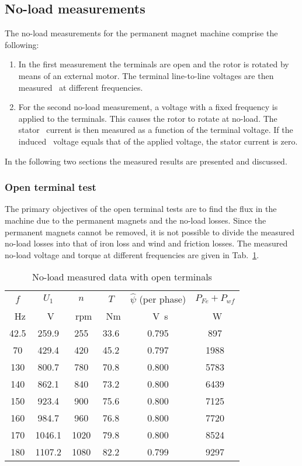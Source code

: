\subsection{No-load measurements}
The no-load measurements for the permanent magnet machine comprise the following:
\begin{enumerate}
  \item In the first measurement the terminals are open and the rotor is rotated by~%
  means of an external motor. The terminal line-to-line voltages are then measured~%
  at different frequencies.  
  \item For the second no-load measurement, a voltage with a fixed frequency is~%
  applied to the terminals. This causes the rotor to rotate at no-load. The stator~%
  current is then measured as a function of the terminal voltage. If the induced~%
  voltage equals that of the applied voltage, the stator current is zero. 
\end{enumerate}
In the following two sections the measured results are presented and discussed.
 
\subsubsection{Open terminal test}
The primary objectives of the open terminal tests are to find the flux in the machine due to the permanent magnets and the no-load losses. Since the permanent magnets cannot be removed, it is not possible to divide the measured no-load losses into that of iron loss and wind and friction losses. The measured no-load voltage and torque at different frequencies are given in Tab.~\ref{tab:NoLoadWithOpenTerminals}. 
\begin{table}[htbp]
  \centering
  \caption{No-load measured data with open terminals}
  \begin{tabular}{cccccc}
      \toprule
      $f$                      &%
      $U_1$                    &%
      $n$                      &%
      $T$                      &%
      $\hat{\psi}$ (per phase) &%
      $P_{Fe}+P_{wf}$%
      \\
      \SI{}{Hz}    &%
      \SI{}{V}     &%
      \SI{}{rpm}   &%
      \SI{}{Nm}    &%
      \SI{}{V.s}   &%
      \SI{}{W}%
      \\
      \midrule
      42.5 & 259.9 & 255    & 33.6 & 0.795  & 897\\
      70   & 429.4 & 420    & 45.2 & 0.797  & 1988\\  
      130  & 800.7 & 780    & 70.8 & 0.800  & 5783\\
      140  &862.1  & 840    & 73.2 & 0.800  & 6439\\
      150  &923.4  & 900    & 75.6 & 0.800  & 7125\\
      160  &984.7  & 960    & 76.8 & 0.800  & 7720\\
      170  &1046.1 & 1020   & 79.8 & 0.800  & 8524\\
      180  &1107.2 & 1080   & 82.2 & 0.799  & 9297\\
    \bottomrule
    \end{tabular}
  \label{tab:NoLoadWithOpenTerminals}
\end{table}

